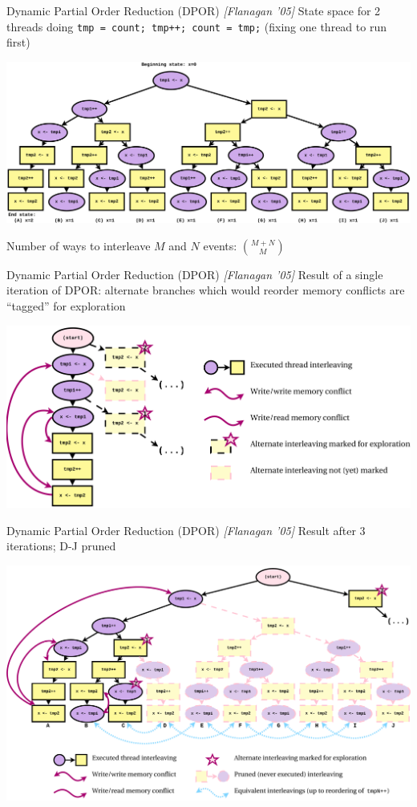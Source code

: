 \documentclass[xcolor=dvipsnames]{beamer}
\begin{document}
\begin{frame}{Dynamic Partial Order Reduction (DPOR) {\em [Flanagan '05]}}
	State space for 2 threads doing {\tt tmp = count; tmp++; count = tmp;} (fixing one thread to run first)
	\begin{center}
		\includegraphics[width=\textwidth]{../statespace-tree.pdf}
	\end{center}
	\linegap

	Number of ways to interleave $M$ and $N$ events: ${M+N \choose M}$
\end{frame}
\begin{frame}{Dynamic Partial Order Reduction (DPOR) {\em [Flanagan '05]}}
	Result of a single iteration of DPOR: alternate branches
	which would reorder memory conflicts are ``tagged'' for exploration
	\begin{center}
		\includegraphics[width=\textwidth]{../dpor-example-0.pdf}
	\end{center}
\end{frame}
\begin{frame}{Dynamic Partial Order Reduction (DPOR) {\em [Flanagan '05]}}
	Result after 3 iterations; D-J pruned
	\begin{center}
		\includegraphics[width=\textwidth]{../dpor-example-1.pdf}
	\end{center}
\end{frame}
\end{document}
